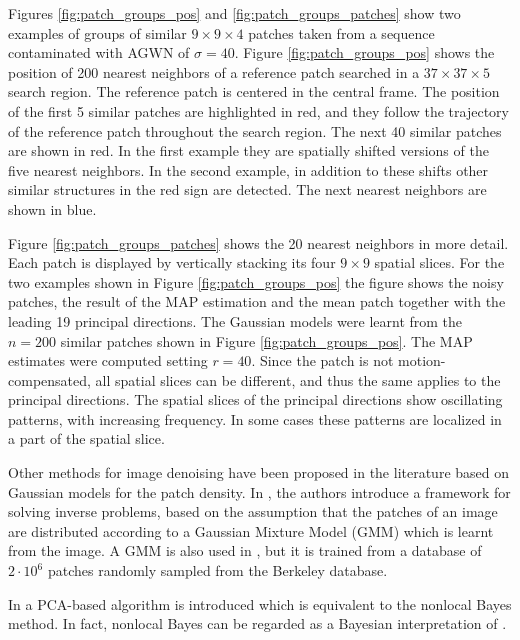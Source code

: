 \documentclass[10pt, a4paper]{article}
\begin{document}
Figures \ref{fig:patch_groups_pos} and \ref{fig:patch_groups_patches}
show two examples of groups of similar $9\times 9\times 4$ patches taken from
a sequence contaminated with AGWN of $\sigma = 40$. Figure
\ref{fig:patch_groups_pos} shows the position of 200 nearest neighbors of a
reference patch searched in a $37\times 37\times 5$ search region. The
reference patch is centered in the central frame. The position of the first 5
similar patches are highlighted in red, and they follow the trajectory of the
reference patch throughout the search region.  The next 40 similar patches are
shown in red. In the first example they are spatially shifted versions of the
five nearest neighbors. In the second example, in addition to these shifts
other similar structures in the red sign are detected.  The next nearest
neighbors are shown in blue.

Figure \ref{fig:patch_groups_patches} shows the 20 nearest neighbors in 
more detail. Each patch is displayed by vertically stacking its four $9\times
9$ spatial slices. For the two examples shown in Figure \ref{fig:patch_groups_pos}
the figure shows the noisy patches, the result of the MAP estimation and the
mean patch together with the leading 19 principal directions. The Gaussian
models were learnt from the $n = 200$ similar patches shown in Figure
\ref{fig:patch_groups_pos}. The MAP estimates were computed setting $r = 40$.
Since the patch is not
motion-compensated, all spatial slices can be different,
and thus the same applies to the principal directions.
The spatial slices of the principal directions show oscillating patterns, with
increasing frequency. In some cases these patterns are localized in a part of
the spatial slice.



\bigskip

Other methods for image denoising have been proposed in the
literature based on Gaussian models for the patch density. In \cite{Yu2012},
the authors introduce a framework for solving inverse problems, based on the
assumption that the patches of an image are distributed according to a Gaussian
Mixture Model (GMM) which is learnt from
the image. A GMM is also used in \cite{Zoran2011}, but it is trained from a
database of $2\cdot 10^6$ patches randomly sampled from the Berkeley database.

In \cite{Zhang2010} a PCA-based algorithm is introduced which is equivalent to 
the nonlocal Bayes method. In fact, nonlocal Bayes can be regarded as a Bayesian 
interpretation of \cite{Zhang2010}.
\end{document}
